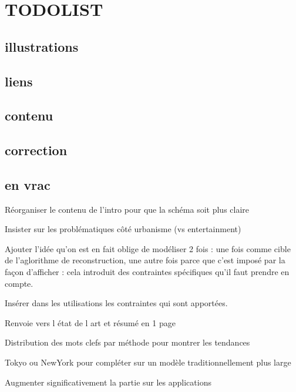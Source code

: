 
\newpage

\section{TODOLIST}

	\subsection{illustrations} 

	\subsection{liens}
	\subsection{contenu}
	\subsection{correction}
	
	
	
	\subsection{en vrac}
	
	Réorganiser le contenu de l’intro pour que la schéma soit plus claire 
	
	Insister sur les problématiques côté urbanisme (vs entertainment)
	
	Ajouter l’idée qu’on est en fait oblige de modéliser 2 fois : une fois comme cible de l’aglorithme de reconstruction, une autre fois parce que c’est imposé par la façon d’afficher : cela introduit des contraintes spécifiques qu’il faut prendre en compte.
	
	Insérer dans les utilisations les contraintes qui sont apportées.
	
	Renvoie vers l état de l art et résumé en 1 page
	
	Distribution des mots clefs par méthode pour montrer les tendances 
	
	Tokyo ou NewYork pour compléter sur un modèle traditionnellement plus large
	
	Augmenter significativement la partie sur les applications 
	
